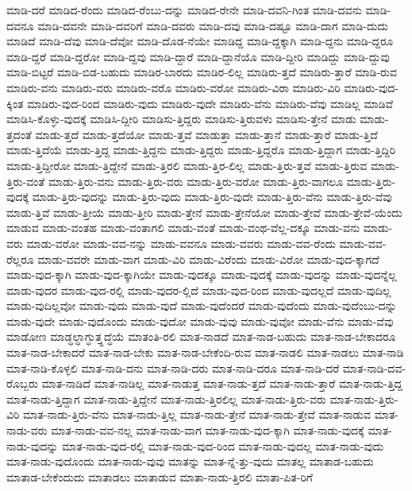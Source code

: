 {ಮಾಡಿ-ದರೆ
ಮಾಡಿದ-ರೆಂದು
ಮಾಡಿದ-ರೆಂಬು-ದನ್ನು
ಮಾಡಿದ-ರೇನೇ
ಮಾಡಿ-ದವನಿ-ಗಿಂತ
ಮಾಡಿ-ದವನು
ಮಾಡಿ-ದವನೂ
ಮಾಡಿ-ದವನೇ
ಮಾಡಿ-ದವರಿಗೆ
ಮಾಡಿ-ದವರು
ಮಾಡಿ-ದವು
ಮಾಡಿ-ದಷ್ಟೂ
ಮಾಡಿ-ದಾಗ
ಮಾಡಿ-ದುದು
ಮಾಡಿದೆ
ಮಾಡಿ-ದೆವು
ಮಾಡಿ-ದೆವೋ
ಮಾಡಿ-ದೊಡ-ನೆಯೇ
ಮಾಡಿದ್ದ
ಮಾಡಿ-ದ್ದಕ್ಕಾಗಿ
ಮಾಡಿ-ದ್ದನು
ಮಾಡಿ-ದ್ದರೂ
ಮಾಡಿ-ದ್ದರೆ
ಮಾಡಿ-ದ್ದರೋ
ಮಾಡಿ-ದ್ದವು
ಮಾಡಿ-ದ್ದಾರೆ
ಮಾಡಿ-ದ್ದಾನೆಯೊ
ಮಾಡಿ-ದ್ದೀರಿ
ಮಾಡಿದ್ದು
ಮಾಡಿ-ದ್ದುವು
ಮಾಡಿ-ಬಿಟ್ಟರೆ
ಮಾಡಿ-ಬಿಡ-ಬಹುದು
ಮಾಡಿರ-ಬಾರದು
ಮಾಡಿರ-ಲಿಲ್ಲ
ಮಾಡಿರು-ತ್ತದೆ
ಮಾಡಿರು-ತ್ತಾರೆ
ಮಾಡಿ-ರುವ
ಮಾಡಿರು-ವನು
ಮಾಡಿರು-ವರು
ಮಾಡಿರು-ವರೊ
ಮಾಡಿರು-ವರೋ
ಮಾಡಿರು-ವಿರಾ
ಮಾಡಿರು-ವಿರಿ
ಮಾಡಿರು-ವುದ-ಕ್ಕಿಂತ
ಮಾಡಿರು-ವುದ-ರಿಂದ
ಮಾಡಿರು-ವುದು
ಮಾಡಿರು-ವುದೇ
ಮಾಡಿರು-ವೆನು
ಮಾಡಿರು-ವೆವು
ಮಾಡಿಲ್ಲ
ಮಾಡಿವೆ
ಮಾಡಿಸಿ-ಕೊಳ್ಳು-ವುದಕ್ಕೆ
ಮಾಡಿಸಿ-ದ್ದೀರಿ
ಮಾಡಿಸು-ತ್ತಿದ್ದರು
ಮಾಡಿಸು-ತ್ತಿರುವಳು
ಮಾಡಿಸು-ತ್ತೇನೆ
ಮಾಡು
ಮಾಡು-ತ್ತದಂತೆ
ಮಾಡು-ತ್ತದೆ
ಮಾಡು-ತ್ತದೆಯೋ
ಮಾಡು-ತ್ತವೆ
ಮಾಡುತ್ತಾ
ಮಾಡು-ತ್ತಾನೆ
ಮಾಡು-ತ್ತಾರೆ
ಮಾಡು-ತ್ತಿದೆ
ಮಾಡು-ತ್ತಿದೆಯೆ
ಮಾಡು-ತ್ತಿದ್ದ
ಮಾಡು-ತ್ತಿದ್ದನು
ಮಾಡು-ತ್ತಿದ್ದರು
ಮಾಡು-ತ್ತಿದ್ದರೊ
ಮಾಡು-ತ್ತಿದ್ದಾಗ
ಮಾಡು-ತ್ತಿದ್ದಿರಿ
ಮಾಡು-ತ್ತಿದ್ದೀರೋ
ಮಾಡು-ತ್ತಿದ್ದೇನೆ
ಮಾಡು-ತ್ತಿರಲಿ
ಮಾಡು-ತ್ತಿರ-ಲಿಲ್ಲ
ಮಾಡು-ತ್ತಿರು-ತ್ತವೆ
ಮಾಡು-ತ್ತಿರುವ
ಮಾಡು-ತ್ತಿರು-ವಂತೆ
ಮಾಡು-ತ್ತಿರು-ವನು
ಮಾಡು-ತ್ತಿರು-ವರು
ಮಾಡು-ತ್ತಿರು-ವರೋ
ಮಾಡು-ತ್ತಿರು-ವಾಗಲೂ
ಮಾಡು-ತ್ತಿರು-ವುದಕ್ಕೆ
ಮಾಡು-ತ್ತಿರು-ವುದನ್ನು
ಮಾಡು-ತ್ತಿರು-ವುದು
ಮಾಡು-ತ್ತಿರು-ವುದೇ
ಮಾಡು-ತ್ತಿರು-ವೆನು
ಮಾಡು-ತ್ತಿರು-ವೆವು
ಮಾಡು-ತ್ತಿವೆ
ಮಾಡು-ತ್ತೀಯೆ
ಮಾಡು-ತ್ತೀರಿ
ಮಾಡು-ತ್ತೇನೆ
ಮಾಡು-ತ್ತೇನೆಯೋ
ಮಾಡು-ತ್ತೇವೆ
ಮಾಡು-ತ್ತೇವೆ-ಯೆಂದು
ಮಾಡುವ
ಮಾಡು-ವಂತಹ
ಮಾಡು-ವಂತಾಗಲಿ
ಮಾಡು-ವಂತೆ
ಮಾಡು-ವಂಥ-ವೆಲ್ಲ-ದಕ್ಕೂ
ಮಾಡು-ವನು
ಮಾಡು-ವರು
ಮಾಡು-ವರೋ
ಮಾಡು-ವವ-ನನ್ನು
ಮಾಡು-ವವನೂ
ಮಾಡು-ವವರು
ಮಾಡು-ವವ-ರೆಂದು
ಮಾಡು-ವವ-ರೆಲ್ಲರೂ
ಮಾಡು-ವವರೇ
ಮಾಡು-ವಾಗ
ಮಾಡು-ವಿರಿ
ಮಾಡು-ವಿರೆಂದು
ಮಾಡು-ವಿರೋ
ಮಾಡು-ವುದ-ಕ್ಕಾಗದೆ
ಮಾಡು-ವುದ-ಕ್ಕಾಗಿ
ಮಾಡು-ವುದ-ಕ್ಕಾಗಿಯೇ
ಮಾಡು-ವುದಕ್ಕೂ
ಮಾಡು-ವುದಕ್ಕೆ
ಮಾಡು-ವುದನ್ನು
ಮಾಡು-ವುದನ್ನೆಲ್ಲ
ಮಾಡು-ವುದರ
ಮಾಡು-ವುದ-ರಲ್ಲಿ
ಮಾಡು-ವುದರ-ಲ್ಲಿದೆ
ಮಾಡು-ವುದ-ರಿಂದ
ಮಾಡು-ವುದಲ್ಲದೆ
ಮಾಡು-ವುದಿಲ್ಲ
ಮಾಡು-ವುದಿಲ್ಲವೋ
ಮಾಡು-ವುದು
ಮಾಡು-ವುದೆ
ಮಾಡು-ವುದೆಂದರೆ
ಮಾಡು-ವುದೆಂದು
ಮಾಡು-ವುದೆಂಬು-ದನ್ನು
ಮಾಡು-ವುದೇ
ಮಾಡು-ವುದೊಂದು
ಮಾಡು-ವುದೋ
ಮಾಡು-ವುವು
ಮಾಡು-ವುವೋ
ಮಾಡು-ವೆನು
ಮಾಡು-ವೆವು
ಮಾಡೋಣ
ಮಾಡ್ಧಲ್ಧಾಗ್ಧುತ್ತ್ಧದ್ಧೆಯೆ
ಮಾತಂತಿ-ರಲಿ
ಮಾತ-ನಾಡದೆ
ಮಾತ-ನಾಡ-ಬಹುದು
ಮಾತ-ನಾಡ-ಬೇಕಾದರೂ
ಮಾತ-ನಾಡ-ಬೇಕಾದರೆ
ಮಾತ-ನಾಡ-ಬೇಕು
ಮಾತ-ನಾಡ-ಬೇಕೆಂದಿ-ರುವ
ಮಾತ-ನಾಡಲಿ
ಮಾತ-ನಾಡಲು
ಮಾತ-ನಾಡಿ
ಮಾತ-ನಾಡಿ-ಕೊಳ್ಳಲಿ
ಮಾತ-ನಾಡಿ-ದನು
ಮಾತ-ನಾಡಿ-ದರು
ಮಾತ-ನಾಡಿ-ದರೂ
ಮಾತ-ನಾಡಿ-ದರೆ
ಮಾತ-ನಾಡಿ-ದವ-ರೊಬ್ಬರು
ಮಾತ-ನಾಡಿದೆ
ಮಾತ-ನಾಡಿಲ್ಲ
ಮಾತ-ನಾಡುತ್ತ
ಮಾತ-ನಾಡು-ತ್ತದೆ
ಮಾತ-ನಾಡು-ತ್ತಾರೆ
ಮಾತ-ನಾಡು-ತ್ತಿದ್ದ
ಮಾತ-ನಾಡು-ತ್ತಿದ್ದಾಗ
ಮಾತ-ನಾಡು-ತ್ತಿದ್ದೇನೆ
ಮಾತ-ನಾಡು-ತ್ತಿರಲಿಲ್ಲ
ಮಾತ-ನಾಡು-ತ್ತಿರು-ವರು
ಮಾತ-ನಾಡು-ತ್ತಿರು-ವಿರಿ
ಮಾತ-ನಾಡು-ತ್ತಿರು-ವೆನು
ಮಾತ-ನಾಡು-ತ್ತಿಲ್ಲ
ಮಾತ-ನಾಡು-ತ್ತೇನೆ
ಮಾತ-ನಾಡು-ತ್ತೇವೆ
ಮಾತ-ನಾಡುವ
ಮಾತ-ನಾಡು-ವರು
ಮಾತ-ನಾಡು-ವವ-ನಲ್ಲ
ಮಾತ-ನಾಡು-ವಾಗ
ಮಾತ-ನಾಡು-ವುದ-ಕ್ಕಾಗಿ
ಮಾತ-ನಾಡು-ವುದಕ್ಕೆ
ಮಾತ-ನಾಡು-ವುದನ್ನು
ಮಾತ-ನಾಡು-ವುದ-ರಲ್ಲಿ
ಮಾತ-ನಾಡು-ವುದ-ರಿಂದ
ಮಾತ-ನಾಡು-ವುದಲ್ಲ
ಮಾತ-ನಾಡು-ವುದು
ಮಾತ-ನಾಡು-ವುದೊಂದು
ಮಾತ-ನಾಡು-ವುವು
ಮಾತನ್ನು
ಮಾತ-ನ್ನೆ-ತ್ತು-ವುದು
ಮಾತಲ್ಲ
ಮಾತಾಡ-ಬಹುದು
ಮಾತಾಡ-ಬೇಕೆಂದುದು
ಮಾತಾಡಲು
ಮಾತಾಡುವ
ಮಾತಾ-ನಾಡು-ತ್ತಿರಲಿ
ಮಾತಾ-ಪಿತ-ರಿಗೆ
}
